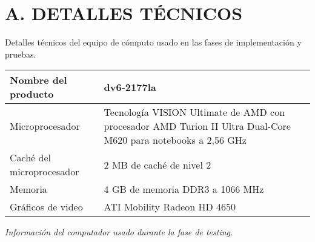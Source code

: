 
\chapter*{A. DETALLES TÉCNICOS}
\label{ape:laptop}
Detalles técnicos del equipo de cómputo usado en las fases de implementación y pruebas.

\begin{center}
\centering
\begin{tabular}{|p{6cm}|p{10cm}|}
\hline
\textbf{Nombre del producto} & \textbf{dv6-2177la}                                                                                           \\ \hline
Microprocesador						   & Tecnología VISION Ultimate de AMD con procesador AMD Turion II Ultra Dual-Core M620 para notebooks a 2,56 GHz \\ \hline
Caché del microprocesador    & 2 MB de caché de nivel 2                                                                                      \\ \hline
Memoria                      & 4 GB de memoria DDR3 a 1066 MHz                                                                               \\ \hline
Gráficos de video            & ATI Mobility Radeon HD 4650                                                                                   \\ \hline
\end{tabular}
\textit{Información del computador usado durante la fase de testing.}
\end{center}

